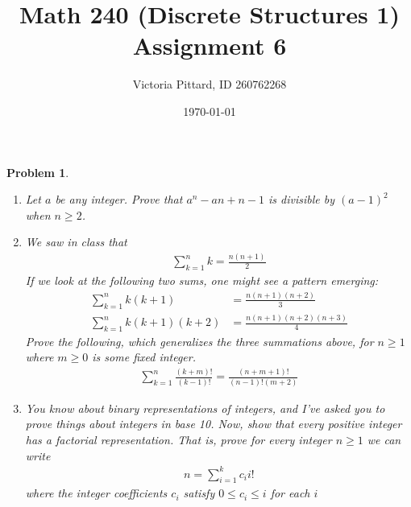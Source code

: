 \documentclass{article}
\newtheorem{problem}{Problem}
\theoremstyle{definition}
\begin{document}
\title{Math 240 (Discrete Structures 1) Assignment 6}
\author{Victoria Pittard, ID 260762268}
\date{\today}

\maketitle

\begin{problem}\text{ \\}
\begin{enumerate}[label=\alph*)]
    \item Let $a$ be any integer. Prove that $a^n-an+n-1$ is divisible by $(a-1)^2$ when $n\ge 2$.
    
    \item We saw in class that
    \begin{align*}
        \sum_{k=1}^n k = \frac{n(n+1)}{2}
    \end{align*}
    If we look at the following two sums, one might see a pattern emerging: 
    \begin{align*}
        \sum_{k=1}^n k(k+1) &= \frac{n(n+1)(n+2)}{3}\\
        \sum_{k=1}^n k(k+1)(k+2) &= \frac{n(n+1)(n+2)(n+3)}{4}
    \end{align*}
    Prove the following, which generalizes the three summations above, for $n\ge 1$ where $m\ge 0$ is some fixed integer.
    \begin{align*}
        \sum_{k=1}^n \frac{(k+m)!}{(k-1)!} = \frac{(n+m+1)!}{(n-1)!(m+2)}
    \end{align*}
    
    \item You know about binary representations of integers, and I've asked you to prove things about integers in base 10. Now, show that every positive integer has a factorial representation. That is, prove for every integer $n\ge 1$ we can write
    \begin{align*}
        n=\sum_{i=1}^k c_i i!
    \end{align*}
    where the integer coefficients $c_i$ satisfy $0\le c_i \le i$ for each $i$
\end{enumerate}
\end{problem}
\end{document}
